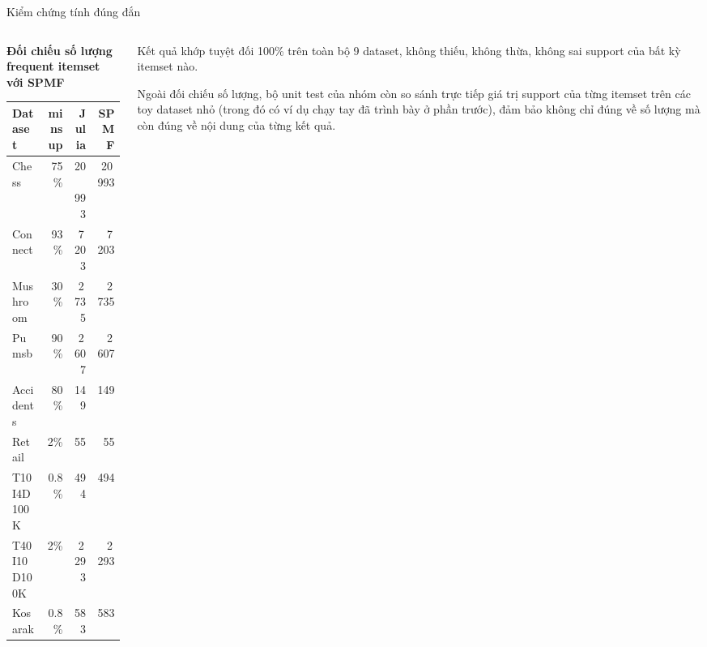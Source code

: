 \documentclass[9pt, aspectratio=169]{beamer}
\begin{document}
\begin{frame}{Kiểm chứng tính đúng đắn}
  \begin{columns}[T,onlytextwidth]
    \begin{column}{0.46\textwidth}
      \small
      \textbf{Đối chiếu số lượng frequent itemset với SPMF}
      \vspace{0.12cm}

      \begin{tabular}{@{}lrrr@{}}
        \toprule
        Dataset & minsup & Julia & SPMF \\
        \midrule
        Chess       & 75\%  & 20\,993 & 20\,993 \\
        Connect     & 93\%  & 7\,203  & 7\,203 \\
        Mushroom    & 30\%  & 2\,735  & 2\,735 \\
        Pumsb       & 90\%  & 2\,607  & 2\,607 \\
        Accidents   & 80\%  & 149     & 149 \\
        Retail      & 2\%   & 55      & 55 \\
        T10I4D100K  & 0.8\% & 494     & 494 \\
        T40I10D100K & 2\%   & 2\,293  & 2\,293 \\
        Kosarak     & 0.8\% & 583     & 583 \\
        \bottomrule
      \end{tabular}
    \end{column}

    \begin{column}{0.50\textwidth}
      \small
      Kết quả khớp tuyệt đối 100\% trên toàn bộ 9 dataset, không thiếu,
      không thừa, không sai support của bất kỳ itemset nào.

      \vspace{0.2cm}
      Ngoài đối chiếu số lượng, bộ unit test của nhóm còn so sánh trực tiếp
      giá trị support của từng itemset trên các toy dataset nhỏ (trong đó
      có ví dụ chạy tay đã trình bày ở phần trước), đảm bảo không chỉ đúng
      về số lượng mà còn đúng về nội dung của từng kết quả.
    \end{column}
  \end{columns}
\end{frame}
\end{document}
